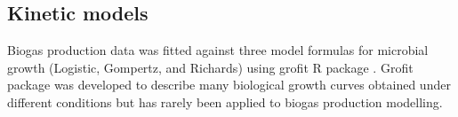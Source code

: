 \subsection{Kinetic models}
Biogas production data was fitted against three model formulas for microbial growth (Logistic, Gompertz, and Richards) using grofit R package \cite{Kahm_2010}. Grofit package was developed to describe many biological growth curves obtained under different conditions but has rarely been applied to biogas production modelling. 